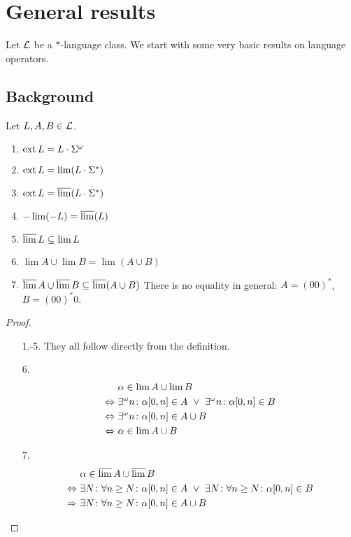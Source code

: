 \section{General results}
\label{general-results}


Let $\mathcal{L}$ be a $*$-language class. We start with some very basic results on language operators.

\subsection{Background}
\begin{lemma}
\label{gen:general}
Let $L,A,B \in \mathcal{L}$.
\begin{enumerate}
\item $\operatorname{ext} L = L \cdot \Sigma^\omega$
\item $\operatorname{ext} L = \lim(L \cdot \Sigma^*)$ %
\item $\operatorname{ext} L = \operatorname{\overline{lim}}(L \cdot \Sigma^*)$ %
\item $- \lim(-L) = \operatorname{\overline{lim}}(L)$
\item $\operatorname{\overline{lim}} L \subseteq \lim L$
\item $\lim A \cup \lim B = \lim(A \cup B)$ %
\item $\operatorname{\overline{lim}} A \cup \operatorname{\overline{lim}} B \subseteq \operatorname{\overline{lim}}(A \cup B)$ \newline %
There is no equality in general: $A = (00)^*$, $B = (00)^*0$.
\end{enumerate}
\begin{proof}
\begin{enumerate}
\item[1.-5.] They all follow directly from the definition.
\item[6.] %
\begin{align*}
& \alpha \in \lim A \cup \lim B \\
\Leftrightarrow \ & \existsinf n \colon \alpha[0,n] \in A \ \vee \ \existsinf n \colon \alpha[0,n] \in B \\
\Leftrightarrow \ & \existsinf n \colon \alpha[0,n] \in A \cup B \\
\Leftrightarrow \ & \alpha \in \lim A \cup B
\end{align*}
\item[7.] %
\begin{align*}
& \alpha \in \dlim A \cup \dlim B \\
\Leftrightarrow \ & \exists N \colon \forall n \ge N \colon \alpha[0,n] \in A \ \vee \ 
\exists N \colon \forall n \ge N \colon \alpha[0,n] \in B \\
\Rightarrow \ & \exists N \colon \forall n \ge N \colon \alpha[0,n] \in A \cup B
\end{align*}
\end{enumerate}
\end{proof}
\end{lemma}

